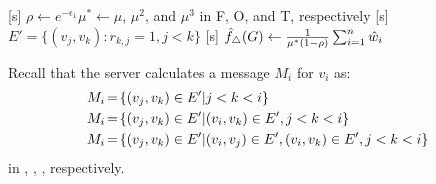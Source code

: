 \setlength{\algomargin}{5mm}
\begin{algorithm}[t]
  \SetAlgoLined
  [s] $\rho \leftarrow e^{-\epsilon_1}$\;
  [$v_i$, s] $\mu^* \leftarrow \mu$, $\mu^2$, and $\mu^3$ in F, O, and T, respectively\;
  [s] $E' = \{(v_j, v_k) :r_{k,j} = 1, j < k\}$\;
  [s] $\hat{f}_\triangle(G) \leftarrow \frac{1}{\mu^*(1-\rho)}\sum_{i=1}^n \hat{w}_i$\;
  \caption{Our three algorithms.
  ``F'', ``O'', ``T'' are shorthands for
  \AlgOne{}, \AlgTwo{}, and \AlgThree{}, respectively.
  [$v_i$] and [s] represent that the process is run by $v_i$ and the server, respectively.
  }\label{chap2-alg:unify}
\end{algorithm}

Recall that the server calculates a message $M_i$ for $v_i$ as:
\begin{align}
\hspace{-1mm} M_i \hspace{-0.5mm} &= \hspace{-0.5mm} \{(v_j, v_k) \in E' | j<k<i\} \label{chap2-eq:M_i_I}\\
\hspace{-1mm} M_i \hspace{-0.5mm} &= \hspace{-0.5mm} \{(v_j, v_k) \in E' | (v_i, v_k) \in E', j<k<i\} \label{chap2-eq:M_i_II}\\
\hspace{-1mm} M_i \hspace{-0.5mm} &= \hspace{-0.5mm}  \{(v_j, v_k) \in E' | (v_i, v_j) \in E', (v_i, v_k) \in E', j<k<i\} \label{chap2-eq:M_i_III}
\end{align}
in \AlgOne{}, \AlgTwo{}, \AlgThree{}, respectively.

